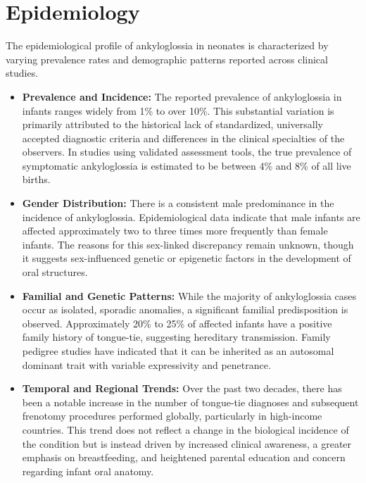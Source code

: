 \section*{Epidemiology}
The epidemiological profile of ankyloglossia in neonates is characterized by varying prevalence rates and demographic patterns reported across clinical studies.
\begin{itemize}
  \item \textbf{Prevalence and Incidence:} The reported prevalence of ankyloglossia in infants ranges widely from 1\% to over 10\%. This substantial variation is primarily attributed to the historical lack of standardized, universally accepted diagnostic criteria and differences in the clinical specialties of the observers. In studies using validated assessment tools, the true prevalence of symptomatic ankyloglossia is estimated to be between 4\% and 8\% of all live births.
  \item \textbf{Gender Distribution:} There is a consistent male predominance in the incidence of ankyloglossia. Epidemiological data indicate that male infants are affected approximately two to three times more frequently than female infants. The reasons for this sex-linked discrepancy remain unknown, though it suggests sex-influenced genetic or epigenetic factors in the development of oral structures.
  \item \textbf{Familial and Genetic Patterns:} While the majority of ankyloglossia cases occur as isolated, sporadic anomalies, a significant familial predisposition is observed. Approximately 20\% to 25\% of affected infants have a positive family history of tongue-tie, suggesting hereditary transmission. Family pedigree studies have indicated that it can be inherited as an autosomal dominant trait with variable expressivity and penetrance.
  \item \textbf{Temporal and Regional Trends:} Over the past two decades, there has been a notable increase in the number of tongue-tie diagnoses and subsequent frenotomy procedures performed globally, particularly in high-income countries. This trend does not reflect a change in the biological incidence of the condition but is instead driven by increased clinical awareness, a greater emphasis on breastfeeding, and heightened parental education and concern regarding infant oral anatomy.
\end{itemize}

